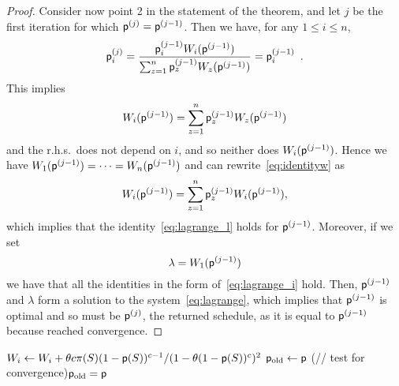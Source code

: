 \begin{proof}
	Consider now point 2 in the statement of the theorem, and let $j$ be the
	first iteration for which $\mathsf{p}^{(j)}=\mathsf{p}^{(j-1)}$. Then we have, for
	any $1\le i\le n$,
	\[
		\mathsf{p}^{(j)}_i = \frac{\mathsf{p}^{(j-1)}_i W_i(\mathsf{p}^{(j-1)})}{\sum_{z=1}^n
		\mathsf{p}^{(j-1)}_z W_z(\mathsf{p}^{(j-1)})} = \mathsf{p}^{(j-1)}_i\enspace.
	\]
	This implies
	\begin{equation}\label{eq:identityw}
		W_i(\mathsf{p}^{(j-1)}) = \sum_{z=1}^n \mathsf{p}^{(j-1)}_z W_z(\mathsf{p}^{(j-1)})
	\end{equation}
	and the r.h.s.~does not depend on $i$, and so neither does
	$W_i(\mathsf{p}^{(j-1)})$. Hence we have
	$W_1(\mathsf{p}^{(j-1)})=\dotsb=W_n(\mathsf{p}^{(j-1)})$ and can
	rewrite~\eqref{eq:identityw} as
	\[
		W_i(\mathsf{p}^{(j-1)}) =  \sum_{z=1}^n \mathsf{p}^{(j-1)}_z
		W_i(\mathsf{p}^{(j-1)}),
	\]
	which implies that the identity~\eqref{eq:lagrange_l} holds for
	$\mathsf{p}^{(j-1)}$. Moreover, if we set
	\[
		\lambda = W_1(\mathsf{p}^{(j-1)})
	\]
	we have that all the identities in the form of~\eqref{eq:lagrange_i} hold.
	Then, $\mathsf{p}^{(j-1)}$ and $\lambda$ form a solution to the
	system~\eqref{eq:lagrange}, which implies that $\mathsf{p}^{(j-1)}$ is optimal
	and so must be $\mathsf{p}^{(j)}$, the returned schedule, as it is equal to
	$\mathsf{p}^{(j-1)}$ because \algoname reached convergence.
\end{proof}

\begin{algorithm}[ht]
	\DontPrintSemicolon
	 {
		 {
			 {
				$W_i \leftarrow W_i + \theta c \pi(S) (1-\mathsf{p}(S))^{c-1}/(1-\theta(1-\mathsf{p}(S))^c)^2$\label{algline:w}\;
			}
		}
		$\mathsf{p}_{\mathrm{old}}\leftarrow \mathsf{p}$\;
		\If(// test for convergence){$\mathsf{p}_{\mathrm{old}} = \mathsf{p}$} {
			\KwBreak\;
		}
	}
	\Return{$\sched$}\;
	\caption{\algoname}
	\label{alg:iterative}
\end{algorithm}
%

